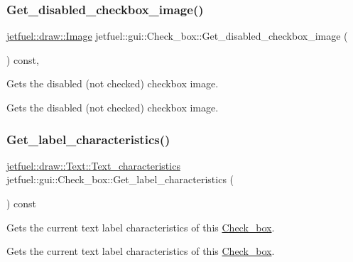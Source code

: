 \subsubsection{\texorpdfstring{Get\+\_\+disabled\+\_\+checkbox\+\_\+image()}{Get\_disabled\_checkbox\_image()}}
{\footnotesize\ttfamily \hyperlink{classjetfuel_1_1draw_1_1Image}{jetfuel\+::draw\+::\+Image} jetfuel\+::gui\+::\+Check\+\_\+box\+::\+Get\+\_\+disabled\+\_\+checkbox\+\_\+image (\begin{DoxyParamCaption}{ }\end{DoxyParamCaption}) const\hspace{0.3cm}{\ttfamily [inline]}, {\ttfamily [protected]}}



Gets the disabled (not checked) checkbox image. 

Gets the disabled (not checked) checkbox image. \mbox{\label{classjetfuel_1_1gui_1_1Check__box_a67e0befe8a0919bf28b5090cddac397e}} 
\subsubsection{\texorpdfstring{Get\+\_\+label\+\_\+characteristics()}{Get\_label\_characteristics()}}
{\footnotesize\ttfamily \hyperlink{structjetfuel_1_1draw_1_1Text_1_1Text__characteristics}{jetfuel\+::draw\+::\+Text\+::\+Text\+\_\+characteristics} jetfuel\+::gui\+::\+Check\+\_\+box\+::\+Get\+\_\+label\+\_\+characteristics (\begin{DoxyParamCaption}{ }\end{DoxyParamCaption}) const\hspace{0.3cm}{\ttfamily [inline]}}



Gets the current text label characteristics of this \hyperlink{classjetfuel_1_1gui_1_1Check__box}{Check\+\_\+box}. 

Gets the current text label characteristics of this \hyperlink{classjetfuel_1_1gui_1_1Check__box}{Check\+\_\+box}. \mbox{\label{classjetfuel_1_1gui_1_1Check__box_a7f14e8be560d0be5a05839442de1f18f}} 

